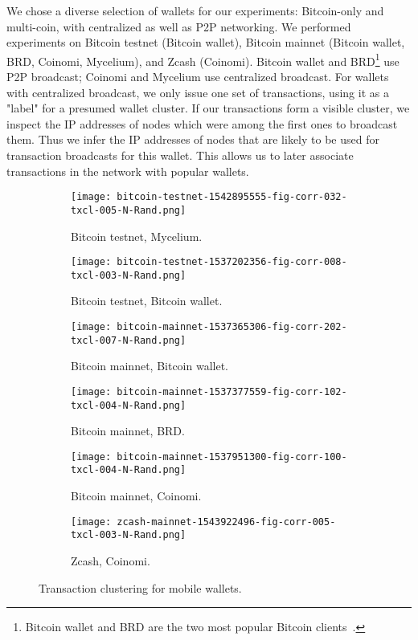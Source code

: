 We chose a diverse selection of wallets for our experiments: Bitcoin-only and multi-coin, with centralized as well as P2P networking.
We performed experiments on Bitcoin testnet (Bitcoin wallet), Bitcoin mainnet (Bitcoin wallet, BRD, Coinomi, Mycelium), and Zcash (Coinomi).
Bitcoin wallet and BRD\footnote{Bitcoin wallet and BRD are the two most popular Bitcoin clients~\cite{Wang2017}.} use P2P broadcast; Coinomi and Mycelium use centralized broadcast.
For wallets with centralized broadcast, we only issue one set of transactions, using it as a "label" for a presumed wallet cluster.
If our transactions form a visible cluster, we inspect the IP addresses of nodes which were among the first ones to broadcast them.
Thus we infer the IP addresses of nodes that are likely to be used for transaction broadcasts for this wallet.
This allows us to later associate transactions in the network with popular wallets.

\begin{figure}
	\centering
	\begin{subfigure}{.5\textwidth}
		\centering
		\texttt{[image: bitcoin-testnet-1542895555-fig-corr-032-txcl-005-N-Rand.png]}
		\caption{Bitcoin testnet, Mycelium.}
	\end{subfigure}%
	\begin{subfigure}{.5\textwidth}
		\centering
		\texttt{[image: bitcoin-testnet-1537202356-fig-corr-008-txcl-003-N-Rand.png]}
		\caption{Bitcoin testnet, Bitcoin wallet.}
	\end{subfigure}
	\begin{subfigure}{.5\textwidth}
		\centering
		\texttt{[image: bitcoin-mainnet-1537365306-fig-corr-202-txcl-007-N-Rand.png]}
		\caption{Bitcoin mainnet, Bitcoin wallet.}
	\end{subfigure}%
	\begin{subfigure}{.5\textwidth}
		\centering
		\texttt{[image: bitcoin-mainnet-1537377559-fig-corr-102-txcl-004-N-Rand.png]}
		\caption{Bitcoin mainnet, BRD.}
	\end{subfigure}
	\begin{subfigure}{.5\textwidth}
		\centering
		\texttt{[image: bitcoin-mainnet-1537951300-fig-corr-100-txcl-004-N-Rand.png]}
		\caption{Bitcoin mainnet, Coinomi.}
	\end{subfigure}%
	\begin{subfigure}{.5\textwidth}
		\centering
		\texttt{[image: zcash-mainnet-1543922496-fig-corr-005-txcl-003-N-Rand.png]}
		\caption{Zcash, Coinomi.}
	\end{subfigure}
	\caption{Transaction clustering for mobile wallets.}
	\label{fig:clustering-all}
\end{figure}

